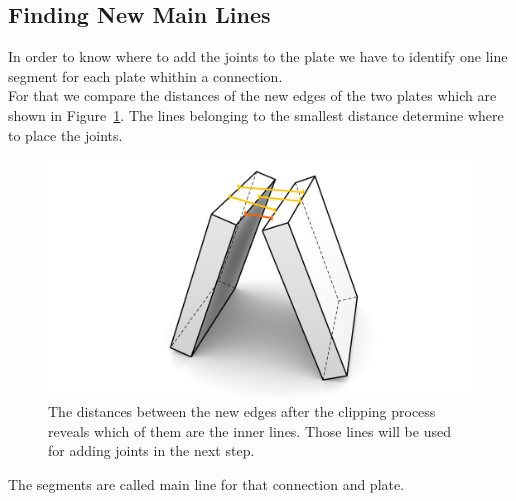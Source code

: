 \documentclass[../ClassicThesis.tex]{subfiles}
\begin{document}
\subsection{Finding New Main Lines}\label{mainLine}
In order to know where to add the joints to the plate we have to identify one line segment for each plate whithin a connection.\\
For that we compare the distances of the new edges of the two plates which are shown in Figure~\ref{fig:mainLinesAfterClipping}. The lines belonging to the smallest distance determine where to place the joints.
\begin{figure}[!ht]
\centering
\includegraphics[width=\columnwidth]{Images/Blocks_No_Touch.png}
\caption{The distances between the new edges after the clipping process reveals which of them are the inner lines. Those lines will be used for adding joints in the next step.}
\label{fig:mainLinesAfterClipping}
\end{figure}

The segments are called main line for that connection and plate.
\end{document}
